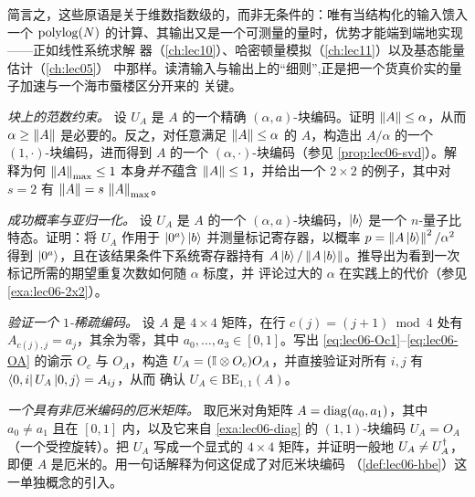 简言之，这些原语是关于维数指数级的，而非无条件的：唯有当结构化的输入馈入一个
$\operatorname{polylog}(N)$ 的计算、其输出又是一个可测量的量时，优势才能端到端地实现——正如线性系统求解
器（\cref{ch:lec10}）、哈密顿量模拟（\cref{ch:lec11}）以及基态能量估计（\cref{ch:lec05}）
中那样。读清输入与输出上的``细则'',正是把一个货真价实的量子加速与一个海市蜃楼区分开来的
关键。

\exercisesection
\begin{exercise}\label{ex:lec06-1}
\emph{块上的范数约束。} 设 $U_A$ 是 $A$ 的一个精确 $(\alpha,a)$-块编码。证明
$\left\lVert A \right\rVert\le\alpha$，从而 $\alpha\ge\left\lVert A \right\rVert$ 是必要的。反之，对任意满足 $\left\lVert A \right\rVert\le\alpha$
的 $A$，构造出 $A/\alpha$ 的一个 $(1,\cdot)$-块编码，进而得到 $A$ 的一个
$(\alpha,\cdot)$-块编码（参见 \cref{prop:lec06-svd}）。解释为何 $\left\lVert A \right\rVert_{\max}\le1$
本身\emph{并不}蕴含 $\left\lVert A \right\rVert\le1$，并给出一个 $2\times2$ 的例子，其中对 $s=2$ 有
$\left\lVert A \right\rVert=s\,\left\lVert A \right\rVert_{\max}$。
\end{exercise}

\begin{exercise}\label{ex:lec06-2}
\emph{成功概率与亚归一化。} 设 $U_A$ 是 $A$ 的一个 $(\alpha,a)$-块编码，$\ket{b}$ 是一个
$n$-量子比特态。证明：将 $U_A$ 作用于 $\ket{0^a}\ket{b}$ 并测量标记寄存器，以概率
$p=\left\lVert A\ket{b} \right\rVert^2/\alpha^2$ 得到 $\ket{0^a}$，且在该结果条件下系统寄存器持有
$A\ket{b}/\left\lVert A\ket{b} \right\rVert$。推导出为看到一次标记所需的期望重复次数如何随 $\alpha$ 标度，并
评论过大的 $\alpha$ 在实践上的代价（参见 \cref{exa:lec06-2x2}）。
\end{exercise}

\begin{exercise}\label{ex:lec06-3}
\emph{验证一个 $1$-稀疏编码。} 设 $A$ 是 $4\times4$ 矩阵，在行 $c(j)=(j+1)\bmod4$ 处有
$A_{c(j),j}=a_j$，其余为零，其中 $a_0,\dots,a_3\in[0,1]$。写出
\eqref{eq:lec06-Oc1}--\eqref{eq:lec06-OA} 的谕示 $O_c$ 与 $O_A$，构造
$U_A=(\mathbb{I}\otimes O_c)O_A$，并直接验证对所有 $i,j$ 有 $\bra{0,i}U_A\ket{0,j}=A_{ij}$，从而
确认 $U_A\in\mathrm{BE}_{1,1}(A)$。
\end{exercise}

\begin{exercise}\label{ex:lec06-4}
\emph{一个具有非厄米编码的厄米矩阵。} 取厄米对角矩阵 $A=\operatorname{diag}(a_0,a_1)$，其中
$a_0\neq a_1$ 且在 $[0,1]$ 内，以及它来自 \cref{exa:lec06-diag} 的 $(1,1)$-块编码
$U_A=O_A$（一个受控旋转）。把 $U_A$ 写成一个显式的 $4\times4$ 矩阵，并证明一般地
$U_A\neq U_A^{\dagger}$，即便 $A$ 是厄米的。用一句话解释为何这促成了对厄米块编码
（\cref{def:lec06-hbe}）这一单独概念的引入。
\end{exercise}

